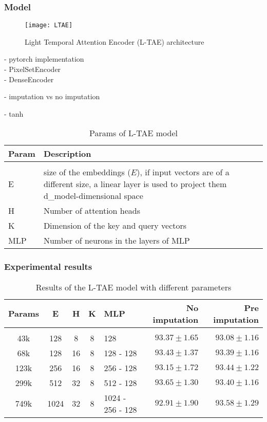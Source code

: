 \subsubsection{Model}

\begin{figure}[!htbp]
  \centering
  \texttt{[image: LTAE]}
  \caption{Light Temporal Attention Encoder  (L-TAE) architecture \cite{LTAE}}
  \label{tab:LTAErchitecture}
\end{figure}

- pytorch implementation\\
- PixelSetEncoder\\
- DenseEncoder

- imputation vs no imputation

- tanh

\begin{table}[ht]
  \centering
  \begin{tabular}{l p{12cm}}   
     Param & Description \\[0.2cm] 
     \hline \\[-0.2cm]  
     E & size of the embeddings ($E$), if input vectors are of a different size, a linear layer is used to project them d\_model-dimensional space \\
     H & Number of attention heads  \\
     K & Dimension of the key and query vectors  \\
     MLP & Number of neurons in the layers of MLP \\
  \end{tabular}
  \caption{Params of L-TAE model}
  \label{tab:LTAEconfig}
\end{table} 

\subsubsection{Experimental results}

\begin{table}[ht]
  \centering
  \begin{tabular}{cccclrr} 
     Params & E & H & K & MLP & No imputation & Pre imputation\\[0.2cm] 
     \hline \\[-0.2cm] 
     43k & 	128 & 	8 & 	8 & 	128 & 	$93.37 \pm 1.65$ & 	$93.08 \pm 1.16$\\ 
     68k & 	128 & 	16 & 	8 & 	128 - 128 & 	$93.43 \pm 1.37$ & 	$93.39 \pm 1.16$\\ 
     123k & 	256 & 	16 & 	8 & 	256 - 128 & 	$93.15 \pm 1.72$ & 	$93.44 \pm 1.22$\\ 
     299k & 	512 & 	32 & 	8 & 	512 - 128 & 	$\mathbf{93.65 \pm 1.30}$ & 	$93.40 \pm 1.16$\\ 
     749k & 	1024 & 	32 & 	8 & 	1024 - 256 - 128 & 	$92.91 \pm 1.90$ & 	$\mathbf{93.58 \pm 1.29}$\\ 
  \end{tabular}
  \caption{Results of the L-TAE model with different parameters}
  \label{tab:LTAEresults}
\end{table}
\pagebreak

